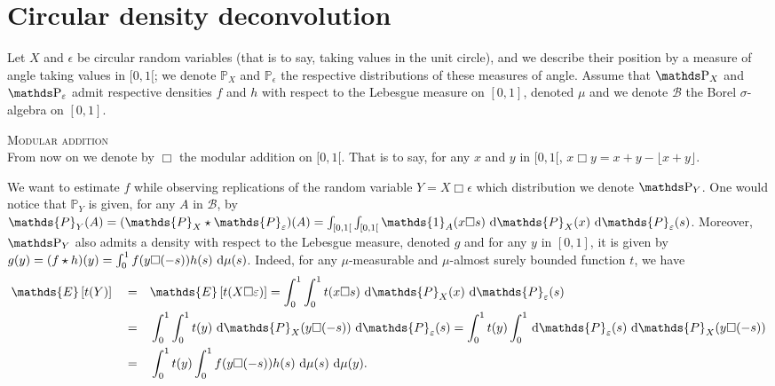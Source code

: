 \section{Circular density deconvolution}\label{INTRO_CIRCULARDECONVOLUTION}\label{bm:ak}

Let $X$ and $\epsilon$ be circular random variables (that is to say, taking values in the unit circle), and we describe their position by a measure of angle taking values in $[0,1[$; we denote $\mathds{P}_{X}$ and $\mathds{P}_{\epsilon}$ the respective distributions of these measures of angle.
Assume that $\P_{X}$ and $\P_{\epsilon}$ admit respective densities $f$ and $h$ with respect to the Lebesgue measure on $[0, 1]$, denoted $\mu$ and we denote $\mathcal{B}$ the Borel $\sigma$-algebra on $[0, 1]$.

\begin{de}{\textsc{Modular addition}\\}\label{DE_INTRO_CIRCULARDECONVOLUTION_MODADD}
From now on we denote by $\Box$ the modular addition on $[0,1[$. That is to say, for any $x$ and $y$ in $[0, 1[$, $x\Box y = x + y - \lfloor x + y \rfloor$.
\assEnd
\end{de}

We want to estimate $f$ while observing replications of the random variable $Y = X \Box \epsilon$ which distribution we denote $\P_{Y}$.
One would notice that $\mathds{P}_{Y}$ is given, for any $A$ in $\mathcal{B}$, by $\mathds{P}_{Y}(A) = (\mathds{P}_{X} \star \mathds{P}_{\epsilon})(A) = \int_{[0,1[}\int_{[0,1[} \mathds{1}_{A}(x \Box s)\d\mathds{P}_{X}(x)\d\mathds{P}_{\epsilon}(s)$.
Moreover, $\P_{Y}$ also admits a density with respect to the Lebesgue measure, denoted $g$ and for any $y$ in $[0, 1]$, it is given by $g(y) = (f \star h)(y) = \int\nolimits_{0}^{1} f(y \Box (- s)) h(s)\operatorname{\, d \!}\mu(s)$.
Indeed, for any $\mu$-measurable and $\mu$-almost surely bounded function $t$, we have
\begin{alignat*}{3}
&\mathds{E}\left[t(Y)\right] &&=&& \mathds{E}\left[t(X \Box \epsilon)\right] = \int_{0}^{1}\int_{0}^{1} t(x \Box s) \d\mathds{P}_{X}(x)\d\mathds{P}_{\epsilon}(s)\\
& &&=&&\int_{0}^{1}\int_{0}^{1} t(y) \d\mathds{P}_{X}(y \Box (-s))\d\mathds{P}_{\epsilon}(s) = \int_{0}^{1} t(y) \int_{0}^{1} \d\mathds{P}_{\epsilon}(s) \d\mathds{P}_{X}(y \Box (-s))\\
& &&=&&\int_{0}^{1} t(y) \int_{0}^{1}f(y \Box (- s)) h(s)\d\mu(s) \d\mu(y).
\end{alignat*}

